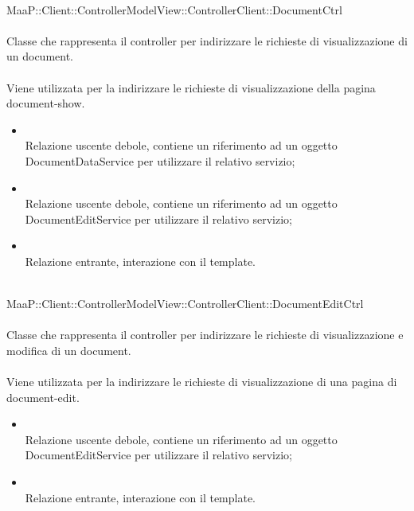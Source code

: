 \\
MaaP::Client::ControllerModelView::ControllerClient::DocumentCtrl\\
\\
Classe che rappresenta il controller per indirizzare le richieste di visualizzazione di un document.\\
\\
Viene utilizzata per la indirizzare le richieste di visualizzazione della pagina document-show.\\
\begin{itemize}
\item{}\\
Relazione uscente debole, contiene un riferimento ad un oggetto DocumentDataService per utilizzare il relativo servizio;
\item{}\\
Relazione uscente debole, contiene un riferimento ad un oggetto DocumentEditService per utilizzare il relativo servizio;
\item{}\\
Relazione entrante, interazione con il template.
\end{itemize}

\\
MaaP::Client::ControllerModelView::ControllerClient::DocumentEditCtrl\\
\\
Classe che rappresenta il controller per indirizzare le richieste di visualizzazione e modifica di un document.\\
\\
Viene utilizzata per la indirizzare le richieste di visualizzazione di una pagina di document-edit.\\
\begin{itemize}
\item{}\\
Relazione uscente debole, contiene un riferimento ad un oggetto DocumentEditService per utilizzare il relativo servizio;
\item{}\\
Relazione entrante, interazione con il template.
\end{itemize}

